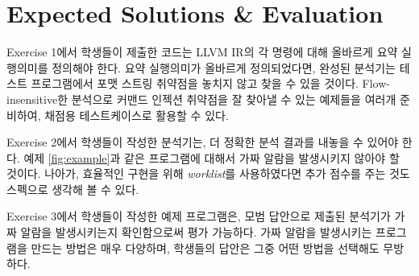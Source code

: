 \documentclass[a4paper, 11pt]{article}
\theoremstyle{definition}
\begin{document}
\section{Expected Solutions \& Evaluation}

 Exercise 1에서 학생들이 제출한 코드는 LLVM IR의 각 명령에 대해 올바르게 요약 실행의미를 정의해야 한다. 요약 실행의미가 올바르게 정의되었다면, 완성된 분석기는 테스트 프로그램에서 포맷 스트링 취약점을 놓치지 않고 찾을 수 있을 것이다. Flow-insensitive한 분석으로 커맨드 인젝션 취약점을 잘 찾아낼 수 있는 예제들을 여러개 준비하여, 채점용 테스트케이스로 활용할 수 있다. 
 
Exercise 2에서 학생들이 작성한 분석기는, 더 정확한 분석 결과를 내놓을 수 있어야 한다. 예제 \ref{fig:example}과 같은 프로그램에 대해서 가짜 알람을 발생시키지 않아야 할 것이다. 나아가, 효율적인 구현을 위해 \emph{worklist}\cite{PALecture}를 사용하였다면 추가 점수를 주는 것도 스펙으로 생각해 볼 수 있다. 

Exercise 3에서 학생들이 작성한 예제 프로그램은, 모범 답안으로 제출된 분석기가 가짜 알람을 발생시키는지 확인함으로써 평가 가능하다. 가짜 알람을 발생시키는 프로그램을 만드는 방법은 매우 다양하며, 학생들의 답안은 그중 어떤 방법을 선택해도 무방하다.



\end{document}
